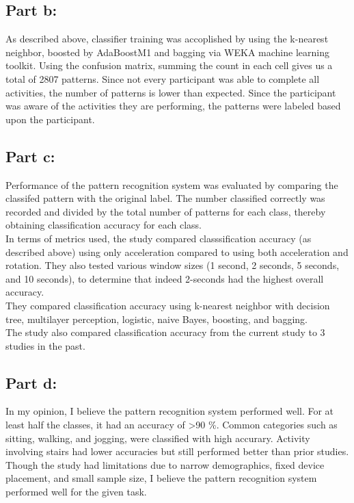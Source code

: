 \documentclass[a4paper,12pt]{article}
\begin{document}
\subsection*{Part b:}
As described above, classifier training was accoplished by using the k-nearest neighbor, boosted by AdaBoostM1 and bagging via WEKA machine learning toolkit. Using the confusion matrix, summing the count in each cell gives us a total of 2807 patterns. Since not every participant was able to complete all activities, the number of patterns is lower than expected. Since the participant was aware of the activities they are performing, the patterns were labeled based upon the participant. 

\subsection*{Part c:}
Performance of the pattern recognition system was evaluated by comparing the classifed pattern with the original label. The number classified correctly was recorded and divided by the total number of patterns for each class, thereby obtaining classification accuracy for each class. \\
In terms of metrics used, the study compared classsification accuracy (as described above) using only acceleration  compared to using both acceleration and rotation. They also tested various window sizes (1 second, 2 seconds, 5 seconds, and 10 seconds), to determine that indeed 2-seconds had the highest overall accuracy.\\
They compared classification accuracy using k-nearest neighbor with decision tree, multilayer perception, logistic, naive Bayes, boosting, and bagging.\\
The study also compared classification accuracy from the current study to 3 studies in the past.

\subsection*{Part d:}
In my opinion, I believe the pattern recognition system performed well.  For at least half the classes, it had an accuracy of \textgreater 90 \%. Common categories such as sitting, walking, and jogging, were classified with high accurary. Activity involving stairs had lower accuracies but still performed better than prior studies. Though the study had limitations due to narrow demographics, fixed device placement, and small sample size, I believe the pattern recognition system performed well for the given task.
\end{document}
